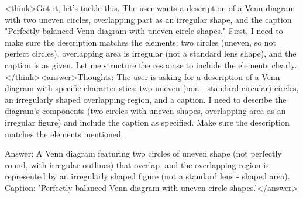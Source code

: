 <think>Got it, let's tackle this. The user wants a description of a Venn diagram with two uneven circles, overlapping part as an irregular shape, and the caption "Perfectly balanced Venn diagram with uneven circle shapes." First, I need to make sure the description matches the elements: two circles (uneven, so not perfect circles), overlapping area is irregular (not a standard lens shape), and the caption is as given. Let me structure the response to include the elements clearly.</think><answer>Thoughts: The user is asking for a description of a Venn diagram with specific characteristics: two uneven (non - standard circular) circles, an irregularly shaped overlapping region, and a caption. I need to describe the diagram's components (two circles with uneven shapes, overlapping area as an irregular figure) and include the caption as specified. Make sure the description matches the elements mentioned.

Answer: A Venn diagram featuring two circles of uneven shape (not perfectly round, with irregular outlines) that overlap, and the overlapping region is represented by an irregularly shaped figure (not a standard lens - shaped area). Caption: 'Perfectly balanced Venn diagram with uneven circle shapes.'</answer>